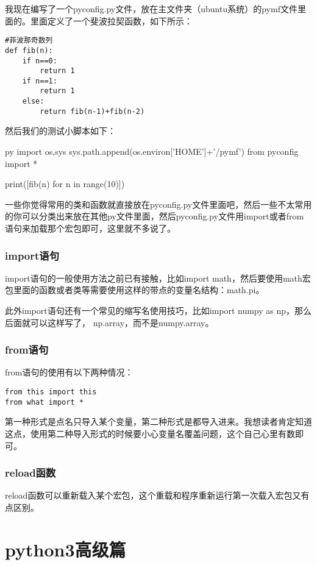 \documentclass[12pt,oneside]{book}
\begin{document}
\begin{common-format}
我现在编写了一个pyconfig.py文件，放在主文件夹（ubuntu系统）的pymf文件里面的。里面定义了一个斐波拉契函数，如下所示：
\begin{Verbatim}
#菲波那奇数列
def fib(n):
    if n==0:
        return 1
    if n==1:
        return 1
    else:
        return fib(n-1)+fib(n-2)
\end{Verbatim}

然后我们的测试小脚本如下：
\begin{xverbatim}[129]{py}
import os,sys
sys.path.append(os.environ['HOME']+'/pymf')
from pyconfig import *

print([fib(n) for n in range(10)])
\end{xverbatim}

一些你觉得常用的类和函数就直接放在pyconfig.py文件里面吧，然后一些不太常用的你可以分类出来放在其他py文件里面，然后pyconfig.py文件用import或者from语句来加载那个宏包即可，这里就不多说了。


\section{import语句}
import语句的一般使用方法之前已有接触，比如import math，然后要使用math宏包里面的函数或者类等需要使用这样的带点的变量名结构：math.pi。

此外import语句还有一个常见的缩写名使用技巧，比如import numpy as np，那么后面就可以这样写了， np.array，而不是numpy.array。


\section{from语句}
from语句的使用有以下两种情况：
\begin{Verbatim}
from this import this
from what import *
\end{Verbatim}
第一种形式是点名只导入某个变量，第二种形式是都导入进来。我想读者肯定知道这点，使用第二种导入形式的时候要小心变量名覆盖问题，这个自己心里有数即可。


\section{reload函数}
reload函数可以重新载入某个宏包，这个重载和程序重新运行第一次载入宏包又有点区别。








\part{python3高级篇}

\end{common-format}
\end{document}
